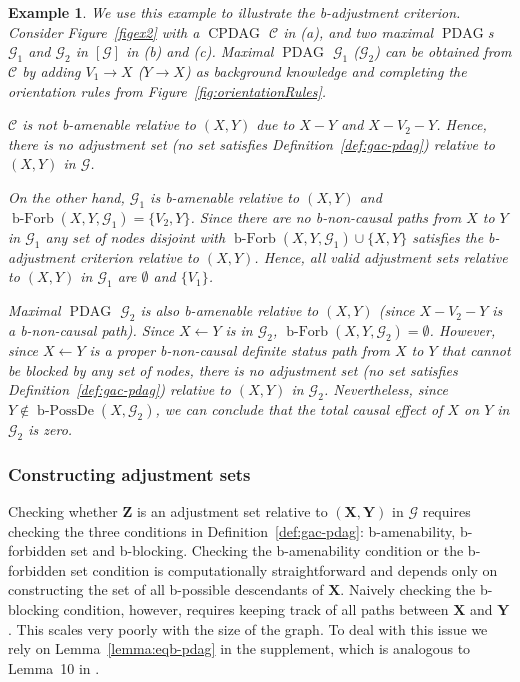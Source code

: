 \documentclass[letterpaper]{article}
\newtheorem{example}[theorem]{Example}
\theoremstyle{definition}
\theoremstyle{remark}
\DeclareMathOperator{\PDAG}{PDAG}
\DeclareMathOperator{\CPDAG}{CPDAG}
\DeclareMathOperator{\bPossDe}{b-PossDe}
\DeclareMathOperator{\bForbb}{b-Forb}
\newcommand{\bamen}{the b-amenability condition}
\newcommand{\bforb}{the b-forbidden set condition}
\newcommand{\bblck}{the b-blocking condition}
\newcommand{\mpdag}{maximal $\PDAG$}
\newcommand{\Mpdag}{Maximal $\PDAG$}
\newcommand{\g}[1][G]{\mathcal{#1}}
\newcommand{\bbf}[2][X,Y]{\bForbb(#1,#2)}
\begin{document}
\begin{example}
We use this example to illustrate the b-adjustment criterion.
   Consider Figure~\ref{figex2} with a $\CPDAG$ $\g[C]$ in (a), and two \mpdag{}s $\g_{1}$ and $\g_{2}$ in $[\g]$ in (b) and (c). \Mpdag{} $\g_{1}$ ($\g_{2}$) can be obtained from $\g[C]$ by adding $V_1 \rightarrow X$ ($Y \rightarrow X$) as background knowledge and completing the orientation rules from Figure~\ref{fig:orientationRules}.

 $\g[C]$ is not b-amenable relative to $(X,Y)$ due to $X - Y$ and $X -V_2 -Y$. Hence, there is no adjustment set (no set satisfies Definition~\ref{def:gac-pdag}) relative to $(X,Y)$ in $\g$.

  On the other hand, $\g_{1}$ is b-amenable relative to $(X,Y)$ and $\bbf{\g_{1}} = \{ V_2, Y\}$. Since there are no b-non-causal paths from $X$ to $Y$ in $\g_{1}$ any set of nodes disjoint with $\bbf{\g_{1}} \cup \{X,Y\}$ satisfies the b-adjustment criterion relative to $(X,Y)$. Hence, all valid adjustment sets relative to $(X,Y)$ in $\g_{1}$ are $\emptyset$ and $\{V_1\}$.

 \Mpdag{} $\g_2$ is also b-amenable relative to $(X,Y)$ (since $X-V_2 -Y$ is a b-non-causal path). Since $X \leftarrow Y$ is in $\g_{2}$, $\bbf{\g_{2}} = \emptyset$. However, since $X \leftarrow Y$ is a proper b-non-causal definite status path from $X$ to $Y$ that cannot be blocked by any set of nodes, there is no adjustment set (no set satisfies Definition~\ref{def:gac-pdag}) relative to $(X,Y)$ in $\g_2$. Nevertheless, since $Y \notin \bPossDe(X,\g_{2})$, we can conclude that the total causal effect of $X$ on $Y$ in $\g_{2}$ is zero.
   \label{ex2}
\end{example}

\subsubsection{Constructing adjustment sets}

Checking whether $\mathbf{Z}$ is an adjustment set relative to $(\mathbf{X,Y})$ in $\g$ requires checking the three conditions in Definition~\ref{def:gac-pdag}: b-amenability, b-forbidden set and b-blocking. Checking \bamen{} or \bforb{} is computationally straightforward and depends only on constructing the set of all b-possible descendants of $\mathbf{X}$. 
Naively checking \bblck{}, however, requires keeping track of all paths between $\mathbf{X}$ and $\mathbf{Y}$. This scales very poorly with the size of the graph. To deal with this issue we rely on Lemma~\ref{lemma:eqb-pdag} in the supplement, which is analogous to Lemma~10 in \citealp{perkovic16}.
\end{document}
